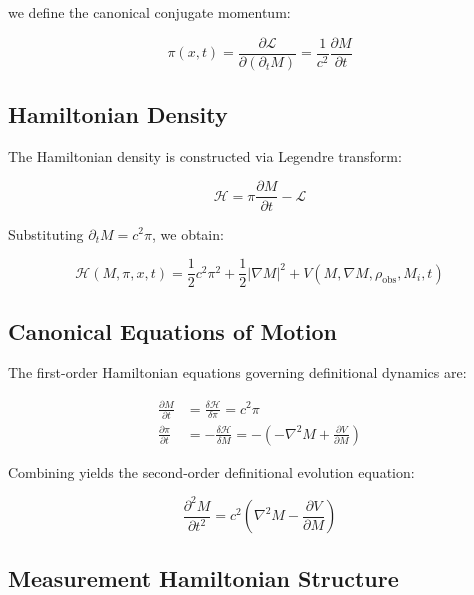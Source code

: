 we define the canonical conjugate momentum:

\begin{equation}
\pi(x,t) = \frac{\partial \mathcal{L}}{\partial (\partial_t M)} = \frac{1}{c^2} \frac{\partial M}{\partial t}
\end{equation}

\subsection{Hamiltonian Density}

The Hamiltonian density is constructed via Legendre transform:

\begin{equation}
\mathcal{H} = \pi \frac{\partial M}{\partial t} - \mathcal{L}
\end{equation}

Substituting \( \partial_t M = c^2 \pi \), we obtain:

\begin{equation}
\mathcal{H}(M, \pi, x, t) = \frac{1}{2} c^2 \pi^2 + \frac{1}{2} |\nabla M|^2 + V(M, \nabla M, \rho_{\text{obs}}, M_i, t)
\end{equation}

\subsection{Canonical Equations of Motion}

The first-order Hamiltonian equations governing definitional dynamics are:

\begin{align}
\frac{\partial M}{\partial t} &= \frac{\delta \mathcal{H}}{\delta \pi} = c^2 \pi \\
\frac{\partial \pi}{\partial t} &= - \frac{\delta \mathcal{H}}{\delta M} = - \left( -\nabla^2 M + \frac{\partial V}{\partial M} \right)
\end{align}

Combining yields the second-order definitional evolution equation:

\begin{equation}
\frac{\partial^2 M}{\partial t^2} = c^2 \left( \nabla^2 M - \frac{\partial V}{\partial M} \right)
\end{equation}

\subsection{Measurement Hamiltonian Structure}

